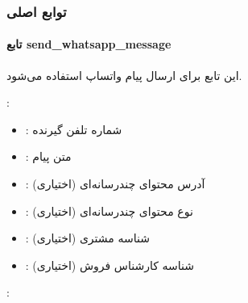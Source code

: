 \documentclass[letterpaper,10pt,english]{sphinxmanual}
\begin{document}
\subsubsection{توابع اصلی}
\label{\detokenize{modules/whatsapp_api:id2}}

\paragraph{تابع send\_whatsapp\_message}
\label{\detokenize{modules/whatsapp_api:send-whatsapp-message}}
\sphinxAtStartPar
این تابع برای ارسال پیام واتساپ استفاده می‌شود.

\sphinxAtStartPar
{}:
\begin{itemize}
\item {} 
\sphinxAtStartPar
{}: شماره تلفن گیرنده

\item {} 
\sphinxAtStartPar
{}: متن پیام

\item {} 
\sphinxAtStartPar
{}: آدرس محتوای چندرسانه‌ای (اختیاری)

\item {} 
\sphinxAtStartPar
{}: نوع محتوای چندرسانه‌ای (اختیاری)

\item {} 
\sphinxAtStartPar
{}: شناسه مشتری (اختیاری)

\item {} 
\sphinxAtStartPar
{}: شناسه کارشناس فروش (اختیاری)

\end{itemize}

\sphinxAtStartPar
{}:

\begin{sphinxVerbatim}[commandchars=\\\{\}]
 

\end{sphinxVerbatim}
\end{document}
